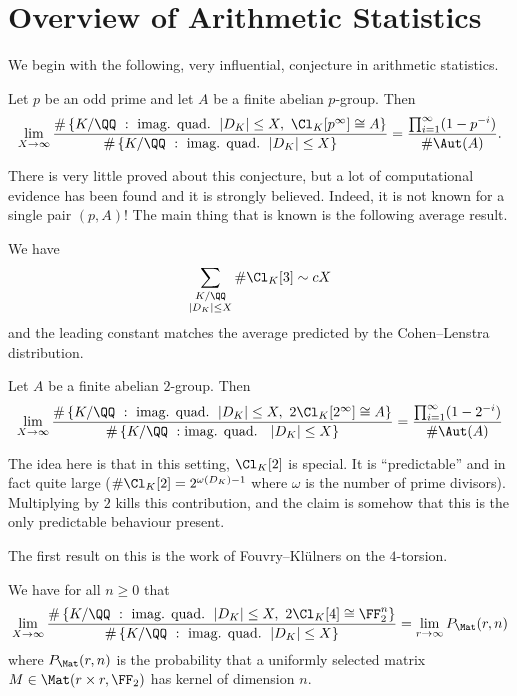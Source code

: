 \documentclass{lecturenotes}
\newcommand{\mat}{\Mat}
\numberwithin{equation}{section}
\begin{document}
\maketitle
\lecture{}{}
\section{Overview of Arithmetic Statistics}
We begin with the following, very influential, conjecture in arithmetic statistics.
\begin{conj}
    Let $p$ be an odd prime and let $A$ be a finite abelian $p$-group.  Then 
    \[\lim_{X\to\infty}\frac{\#\set{K/\QQ~:~\textnormal{imag. quad. }\abs{D_K}\leq X,\ \Cl_K[p^\infty]\cong A}}{\#\set{K/\QQ~:~\textnormal{imag. quad. }\abs{D_K}\leq X}}=\frac{\prod_{i=1}^\infty (1-p^{-i})}{\#\Aut(A)}.\]
\end{conj}
There is very little proved about this conjecture, but a lot of computational evidence has been found and it is strongly believed.  Indeed, it is not known for a single pair $(p,A)$!  The main thing that is known is the following average result.

\begin{theorem} We have
    \[\sum_{\substack{K/\QQ\\\abs{D_K}\leq X}}\#\Cl_K[3]\sim cX\]
    and the leading constant matches the average predicted by the Cohen--Lenstra distribution.
\end{theorem}

\begin{conj}\label{conj:CLG}
    Let $A$ be a finite abelian $2$-group.  Then 
    \[\lim_{X\to\infty}\frac{\#\set{K/\QQ~:~\textnormal{imag. quad. }\abs{D_K}\leq X,\ 2\Cl_K[2^\infty]\cong A}}{\#\set{K/\QQ~:\textnormal{imag. quad. }~\abs{D_K}\leq X}}=\frac{\prod_{i=1}^\infty (1-2^{-i})}{\#\Aut(A)}\]
\end{conj}

The idea here is that in this setting, $\Cl_K[2]$ is special.  It is ``predictable'' and in fact quite large ($\#\Cl_K[2]=2^{\omega(D_K)-1}$ where $\omega$ is the number of prime divisors).  Multiplying by $2$ kills this contribution, and the claim is somehow that this is the only predictable behaviour present.

The first result on this is the work of Fouvry--Kl\"ulners on the $4$-torsion.

\begin{theorem}
    We have for all $n\geq 0$ that
    \[\lim_{X\to\infty}\frac{\#\set{K/\QQ~:~\textnormal{imag. quad. }\abs{D_K}\leq X,\ 2\Cl_K[4]\cong \FF_2^n}}{\#\set{K/\QQ~:~\textnormal{imag. quad. }\abs{D_K}\leq X}}=\lim_{r\to\infty}P_{\mat}(r,n)\]
    where $P_{\mat}(r,n)$ is the probability that a uniformly selected matrix $M\in \mat(r\times r, \FF_2)$ has kernel of dimension $n$.
\end{theorem}
\end{document}
